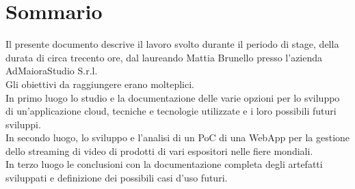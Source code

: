\cleardoublepage
{}
{}
\begingroup
\let\clearpage\relax
\let\cleardoublepage\relax
\let\cleardoublepage\relax

\chapter*{Sommario}

Il presente documento descrive il lavoro svolto durante il periodo di stage, della durata di circa trecento ore, dal laureando Mattia Brunello presso l'azienda AdMaioraStudio S.r.l.\\
Gli obiettivi da raggiungere erano molteplici.\\
In primo luogo lo studio e la documentazione delle varie opzioni per lo sviluppo di un'applicazione cloud, tecniche e tecnologie utilizzate e i loro possibili futuri sviluppi.\\
In secondo luogo, lo sviluppo e l'analisi di un PoC di una WebApp per la gestione dello streaming di video di prodotti di vari espositori nelle fiere mondiali.\\
In terzo luogo le conclusioni con la documentazione completa degli artefatti sviluppati e definizione dei possibili casi d'uso futuri.\\




\endgroup

\vfill

